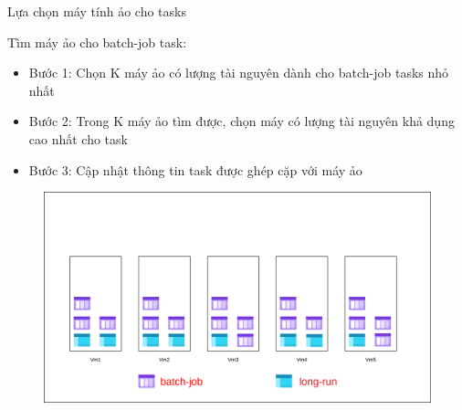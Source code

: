 \documentclass[11pt,xcolor={dvipsnames}, aspectratio=169]{beamer}
\begin{document}
\begin{frame}
{Lựa chọn máy tính ảo cho tasks}

	\begin{minipage}[t]{0.4\linewidth}
		\vspace{0.5cm}
		Tìm máy ảo cho batch-job task: 
		\begin{itemize}
			\item Bước 1: Chọn K máy ảo có lượng tài nguyên dành cho batch-job tasks nhỏ nhất 
			\item Bước 2: Trong K máy ảo tìm được, chọn máy có lượng tài nguyên khả dụng cao nhất cho task 
			\item {Bước 3}: Cập nhật thông tin task được ghép cặp với máy ảo
		\end{itemize}
	\end{minipage}
	\hfill
	\begin{minipage}[t]{0.59\linewidth}
	\begin{figure}
		\vspace{1cm}
		\includegraphics[scale=0.35]{images/balancing_tasks9.png}
	\end{figure}
	\vspace{1cm}
	\end{minipage}
\end{frame}
\end{document}
